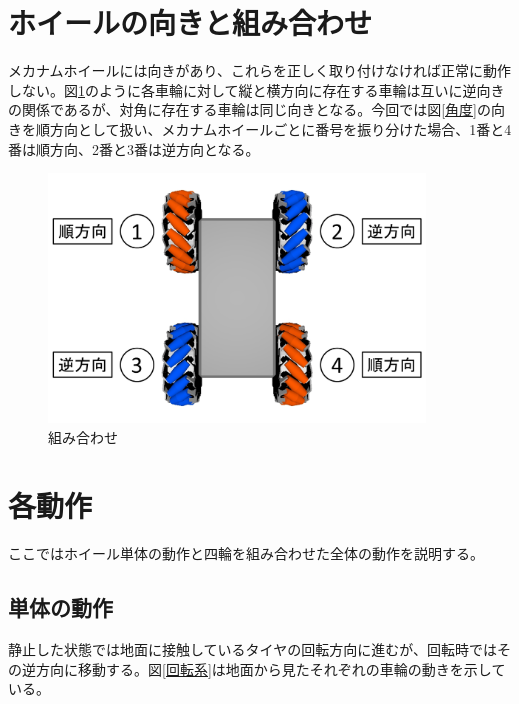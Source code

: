 \documentclass[12pt,oneside]{sotsuken_paper}
\begin{document}
	\section{ホイールの向きと組み合わせ}
	メカナムホイールには向きがあり、これらを正しく取り付けなければ正常に動作しない。図\ref{対角}のように各車輪に対して縦と横方向に存在する車輪は互いに逆向きの関係であるが、対角に存在する車輪は同じ向きとなる。今回では図\ref{角度}の向きを順方向として扱い、メカナムホイールごとに番号を振り分けた場合、1番と4番は順方向、2番と3番は逆方向となる。

	\begin{figure}[htp]
		\begin{center}
			\includegraphics[width=100mm]{Image/対角.png}
			\caption{組み合わせ}
			\label{対角}
		\end{center}
	\end{figure}

	\section{各動作}
	ここではホイール単体の動作と四輪を組み合わせた全体の動作を説明する。

		\subsection{単体の動作}
		静止した状態では地面に接触しているタイヤの回転方向に進むが、回転時ではその逆方向に移動する。図\ref{回転系}は地面から見たそれぞれの車輪の動きを示している。
\end{document}
